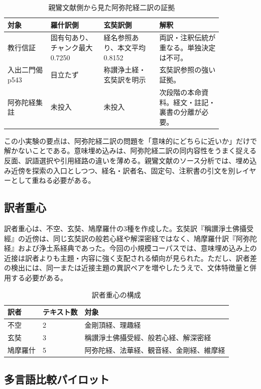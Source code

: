 \documentclass[uplatex,dvipdfmx,11pt,a4paper]{jsarticle}
\begin{document}
\begin{table}[H]
\centering
\small
\caption{親鸞文献側から見た阿弥陀経二訳の証拠}
\label{tab:shinran-amida-source}
\begin{tabular}{p{0.17\linewidth}p{0.21\linewidth}p{0.22\linewidth}p{0.25\linewidth}}
\toprule
対象 & 羅什訳側 & 玄奘訳側 & 解釈 \\
\midrule
教行信証 & 固有句あり、チャンク最大0.7250 & 経名参照あり、本文平均0.8152 & 両訳・注釈伝統が重なる。単独決定は不可。 \\
入出二門偈 p543 & 目立たず & 称讃浄土経・玄奘訳を明示 & 玄奘訳参照の強い証拠。 \\
阿弥陀経集註 & 未投入 & 未投入 & 次段階の本命資料。経文・註記・裏書の分離が必要。 \\
\bottomrule
\end{tabular}
\end{table}

この小実験の要点は、阿弥陀経二訳の問題を「意味的にどちらに近いか」だけで解かないことである。意味埋め込みは、阿弥陀経二訳の同内容性をうまく捉える反面、訳語選択や引用経路の違いを薄める。親鸞文献のソース分析では、埋め込み近傍を探索の入口としつつ、経名・訳者名、固定句、注釈書の引文を別レイヤーとして重ねる必要がある。

\subsection{訳者重心}

訳者重心は、不空、玄奘、鳩摩羅什の3種を作成した。玄奘訳『稱讃淨土佛攝受經』の近傍は、同じ玄奘訳の般若心経や解深密経ではなく、鳩摩羅什訳『阿弥陀経』および浄土系経典であった。今回の小規模コーパスでは、意味埋め込み上の近接は訳者よりも主題・内容に強く支配される傾向が見られた。ただし、訳者差の検出には、同一または近接主題の異訳ペアを増やしたうえで、文体特徴量と併用する必要がある。

\begin{table}[H]
\centering
\caption{訳者重心の構成}
\begin{tabular}{lll}
\toprule
訳者 & テキスト数 & 対象 \\
\midrule
不空 & 2 & 金剛頂経、理趣経 \\
玄奘 & 3 & 稱讃淨土佛攝受經、般若心経、解深密経 \\
鳩摩羅什 & 5 & 阿弥陀経、法華経、観音経、金剛経、維摩経 \\
\bottomrule
\end{tabular}
\end{table}

\subsection{多言語比較パイロット}
\end{document}
